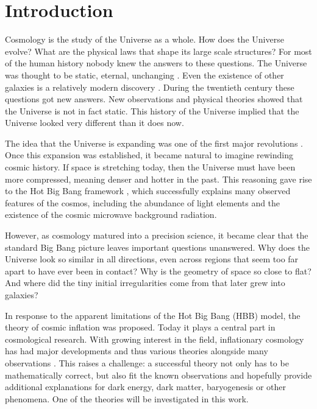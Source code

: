 \section{Introduction}

Cosmology is the study of the Universe as a whole. How does the Universe evolve? What are the physical laws that shape its large scale structures? For most of the human history nobody knew the answers to these questions. The Universe was thought to be static, eternal, unchanging \cite{palmer2008parmenides}. Even the existence of other galaxies is a relatively modern discovery \cite{hubble1925cepheids}. During the twentieth century these questions got new answers. New observations and physical theories showed that the Universe is not in fact static. This history of the Universe implied that the Universe looked very different than it does now.  

The idea that the Universe is expanding was one of the first major revolutions \cite{hubble1929relation}. Once this expansion was established, it became natural to imagine rewinding cosmic history. If space is stretching today, then the Universe must have been more compressed, meaning denser and hotter in the past. This reasoning gave rise to the Hot Big Bang framework \cite{alpher1948origin}, which successfully explains many observed features of the cosmos, including the abundance of light elements and the existence of the cosmic microwave background radiation.

However, as cosmology matured into a precision science, it became clear that the standard Big Bang picture leaves important questions unanswered. Why does the Universe look so similar in all directions, even across regions that seem too far apart to have ever been in contact? Why is the geometry of space so close to flat? And where did the tiny initial irregularities come from that later grew into galaxies?

In response to the apparent limitations of the Hot Big Bang (HBB) model, the theory of cosmic inflation was proposed. Today it plays a central part in cosmological research. With growing interest in the field, inflationary cosmology has had major developments and thus various theories alongside many observations \cite{levi2019dark} \cite{aghanim2020planck}. This raises a challenge: a successful theory not only has to be mathematically correct, but also fit the known observations and hopefully provide additional explanations for dark energy, dark matter, baryogenesis or other phenomena. One of the theories will be investigated in this work.

